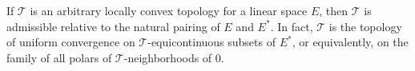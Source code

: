 If $\mathcal{T}$ is an arbitrary locally convex topology for a linear space $E$, then $\mathcal{T}$ is admissible relative to the natural pairing of $E$ and $E^*$. In fact, $\mathcal{T}$ is the topology of uniform convergence on $\mathcal{T}$-equicontinuous subsets of $E^*$, or equivalently, on the family of all polars of $\mathcal{T}$-neighborhoods of $0$.
